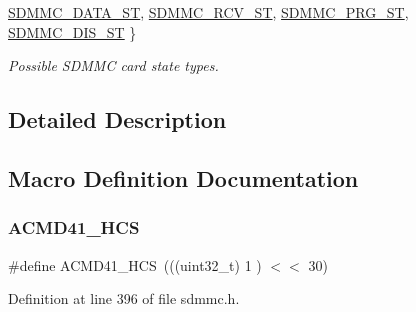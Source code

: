 \begin{DoxyCompactItemize}
\hyperlink{group___c_h_i_p___s_d_m_m_c___definitions_gga3d5ee2c34be91e20a16b951a7b23f098a4fa3e592dba7f784cbc877f0c869cbab}{S\+D\+M\+M\+C\+\_\+\+D\+A\+T\+A\+\_\+\+ST}, 
\hyperlink{group___c_h_i_p___s_d_m_m_c___definitions_gga3d5ee2c34be91e20a16b951a7b23f098ae5e420ef742b803afcca05b76c180564}{S\+D\+M\+M\+C\+\_\+\+R\+C\+V\+\_\+\+ST}, 
\hyperlink{group___c_h_i_p___s_d_m_m_c___definitions_gga3d5ee2c34be91e20a16b951a7b23f098a5d639aa90219ae9087a10fb316b170a3}{S\+D\+M\+M\+C\+\_\+\+P\+R\+G\+\_\+\+ST}, 
\newline
\hyperlink{group___c_h_i_p___s_d_m_m_c___definitions_gga3d5ee2c34be91e20a16b951a7b23f098a3946957a4bfb8b32d9b3cbbe0a81d31b}{S\+D\+M\+M\+C\+\_\+\+D\+I\+S\+\_\+\+ST}
 \}\begin{DoxyCompactList}\small\item\em Possible S\+D\+M\+MC card state types. \end{DoxyCompactList}
\end{DoxyCompactItemize}


\subsection{Detailed Description}


\subsection{Macro Definition Documentation}
\mbox{\label{group___c_h_i_p___s_d_m_m_c___definitions_gad46a44a7d512d77fdef4b897604e90ba}} 
\subsubsection{\texorpdfstring{A\+C\+M\+D41\+\_\+\+H\+CS}{ACMD41\_HCS}}
{\footnotesize\ttfamily \#define A\+C\+M\+D41\+\_\+\+H\+CS~(((uint32\+\_\+t) 1 ) $<$$<$ 30)}



Definition at line 396 of file sdmmc.\+h.

\mbox{\label{group___c_h_i_p___s_d_m_m_c___definitions_gaf1a3caba87784e8312ce03952a81d812}} 
